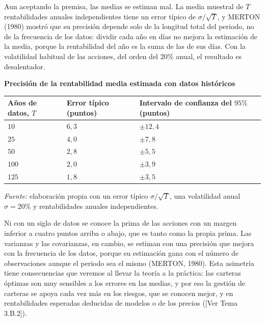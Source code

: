 \documentclass[10pt,a4paper]{article}
\newcommand{\authorfont}[1]{{\fontfamily{EBGaramond-TLF}\selectfont #1}}
\begin{document}
Aun aceptando la premisa, las medias se estiman mal. La media muestral de $T$ rentabilidades anuales independientes tiene un error típico de $\sigma/\sqrt{T}$, y MERTON (1980) mostró que su precisión depende solo de la longitud total del periodo, no de la frecuencia de los datos: dividir cada año en días no mejora la estimación de la media, porque la rentabilidad del año es la suma de las de sus días. Con la volatilidad habitual de las acciones, del orden del $20\%$ anual, el resultado es desalentador.

\begin{center}\begin{minipage}{\linewidth}\centering
{\small\textbf{Precisión de la rentabilidad media estimada con datos históricos}}\par\vspace{0.5em}
{\small\renewcommand{\arraystretch}{1.4}%
\begin{tabular}{p{3.2cm}p{3.6cm}p{5.4cm}}
\hline
\raggedright\textbf{Años de datos}, $T$ & \raggedright\textbf{Error típico} (puntos) & \raggedright\textbf{Intervalo de confianza del $95\%$} (puntos)\tabularnewline
\hline
$10$ & $6{,}3$ & $\pm12{,}4$\tabularnewline
$25$ & $4{,}0$ & $\pm7{,}8$\tabularnewline
$50$ & $2{,}8$ & $\pm5{,}5$\tabularnewline
$100$ & $2{,}0$ & $\pm3{,}9$\tabularnewline
$125$ & $1{,}8$ & $\pm3{,}5$\tabularnewline
\hline
\end{tabular}}\par\vspace{0.3em}
{\small\textit{Fuente: }elaboración propia con un error típico $\sigma/\sqrt{T}$, una volatilidad anual $\sigma=20\%$ y rentabilidades anuales independientes.}
\end{minipage}\end{center}

Ni con un siglo de datos se conoce la prima de las acciones con un margen inferior a cuatro puntos arriba o abajo, que es tanto como la propia prima. Las varianzas y las covarianzas, en cambio, se estiman con una precisión que mejora con la frecuencia de los datos, porque su estimación gana con el número de observaciones aunque el periodo sea el mismo (MERTON, 1980). Esta asimetría tiene consecuencias que veremos al llevar la teoría a la práctica: las carteras óptimas son muy sensibles a los errores en las medias, y por eso la gestión de carteras se apoya cada vez más en los riesgos, que se conocen mejor, y en rentabilidades esperadas deducidas de modelos o de los precios ([\authorfont{Ver Tema 3.B.2}]).
\end{document}

